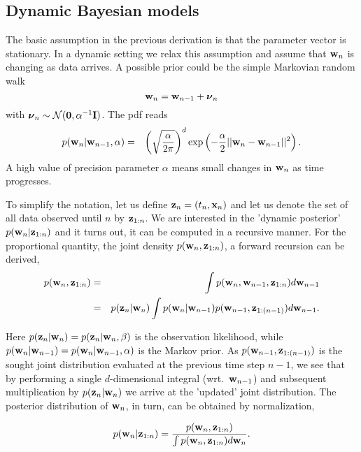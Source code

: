 \documentclass[A4,12pt]{article}    %
\def\xb{{\bf x}}
\def\zb{{\bf z}}
\def\wb{{\bf w}}
\def\nub{\text{\boldmath $\nu$}}
\def\xb{{\bf x}}
\begin{document}
\subsection*{Dynamic Bayesian models}
The basic assumption in the previous derivation is that the parameter vector is stationary. In a dynamic setting we relax this assumption and assume that $\wb_n$ is changing as data arrives. A possible prior could be the simple Markovian random walk
\begin{equation}
\wb_n =  \wb_{n-1} + \nub_n  \label{Markov}
\end{equation}
with $\nub_n \sim \mathcal{N}({\bf 0},\alpha^{-1}{\bf I})$. The pdf reads
\begin{eqnarray}
 p(\wb_n|\wb_{n-1},\alpha) &=&  \left(\sqrt{\frac{\alpha}{2\pi}}\right)^{d} \exp\left(-\frac{\alpha}{2}||\wb_n-\wb_{n-1}||^2\right). \label{dynprior}
\end{eqnarray}
A high value of precision parameter $\alpha$ means small changes in $\wb_n$ as time progresses.

To simplify the notation, let us define $\zb_n =(t_n,\xb_n)$ and let us denote the set of all data observed until $n$ by $\zb_{1:n}$. We are interested in the 'dynamic posterior' $p(\wb_n|\zb_{1:n})$ and it turns out, it can be computed in a recursive manner. For the proportional quantity, the joint density $p(\wb_n ,\zb_{1:n})$, a forward recursion can be derived,
\begin{eqnarray}
 p(\wb_n ,\zb_{1:n}) &=& \int p(\wb_n ,\wb_{n-1}, \zb_{1:n})d\wb_{n-1} \label{dyn1} \\
      &=& p(\zb_{n}|\wb_n)\int p(\wb_n | \wb_{n-1})p( \wb_{n-1},\zb_{1:(n-1)})d\wb_{n-1} \label{dyn5}.
\end{eqnarray}

  Here $p(\zb_{n}|\wb_n)= p(\zb_{n}|\wb_n, \beta)$  is the observation likelihood, while $p(\wb_n | \wb_{n-1})=p(\wb_n | \wb_{n-1},\alpha)$ is the Markov prior.
  As $p( \wb_{n-1},\zb_{1:(n-1)})$ is the sought joint distribution evaluated at the previous time step $n-1$, we see that by performing a single $d$-dimensional integral (wrt.\ $\wb_{n-1}$) and subsequent multiplication by $p(\zb_{n}|\wb_n)$ we arrive at the 'updated' joint distribution. The posterior distribution of $\wb_n$, in turn, can be obtained by normalization,

\begin{equation}
  p(\wb_n | \zb_{1:n})  = \frac{p(\wb_n ,\zb_{1:n})}{\int p(\wb_n ,\zb_{1:n}) d\wb_n}.
\end{equation}
\end{document}
